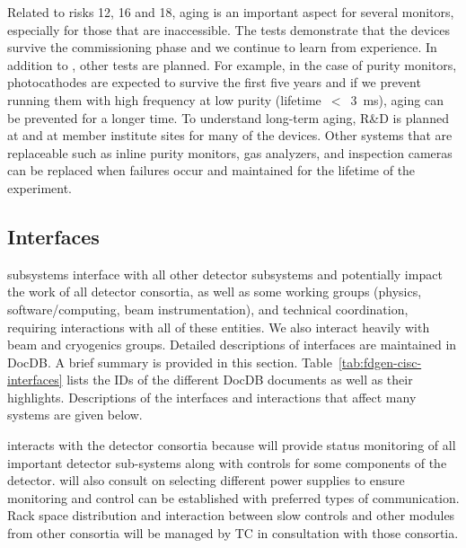 Related to risks 12, 16 and 18, aging is an important aspect for several monitors, especially for those that are inaccessible. The  tests demonstrate that the devices survive the commissioning phase and we continue to learn from  experience. In addition to , other tests are planned. For example, in the case of purity monitors, photocathodes are expected to survive the first five years and if we prevent running them with high frequency at low purity (lifetime~$<$~\SI{3}{\milli\second}), aging can be prevented for a longer time. To understand long-term aging, R\&D is planned at  and at member institute sites for many of the devices. Other systems that are replaceable such as inline purity monitors, gas analyzers, and inspection cameras can be replaced when failures occur and maintained for the lifetime of the experiment.
 





\subsection{Interfaces}  %
\label{sec:interfaces}

 subsystems interface with all other detector subsystems and potentially impact the work of all detector consortia, as well as some
working groups (physics, software/computing, beam instrumentation), and technical coordination, requiring interactions with all of these entities.  We also interact heavily with  beam and cryogenics groups.  
Detailed descriptions of  interfaces are maintained in  DocDB. A brief summary is provided in this section. Table~\ref{tab:fdgen-cisc-interfaces} lists the IDs of the different DocDB documents as well as their highlights. Descriptions of the interfaces and interactions that affect many systems are given below. 

 interacts with the detector consortia because  will provide status monitoring of all important detector sub-systems along with controls for some components of the detector.
 will also consult on selecting different power supplies to ensure monitoring and control can be established with preferred types of communication. 
Rack space distribution and interaction between slow controls and other modules from other consortia will be managed by TC in consultation with those consortia. 

